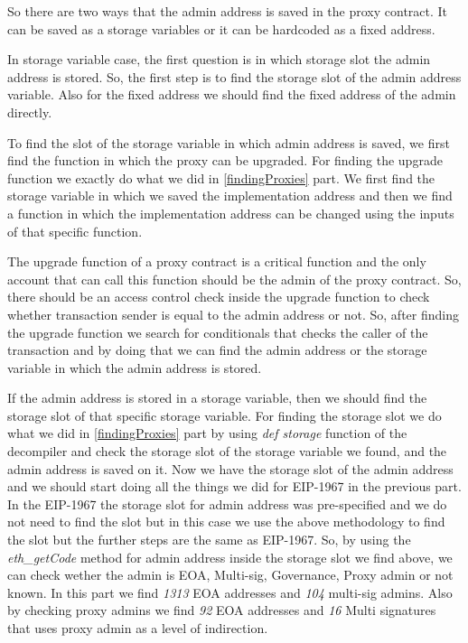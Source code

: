 So there are two ways that the admin address is saved in the proxy contract. It can be saved as a storage variables or it can be hardcoded as a fixed address.

In storage variable case, the first question is in which storage slot the admin address is stored. So, the first step is to find the storage slot of the admin address variable. Also for the fixed address we should find the fixed address of the admin directly.

To find the slot of the storage variable in which admin address is saved, we first find the function in which the proxy can be upgraded. For finding the upgrade function we exactly do what we did in \ref{findingProxies} part. We first find the storage variable in which we saved the implementation address and then we find a function in which the implementation address can be changed using the inputs of that specific function. 

The upgrade function of a proxy contract is a critical function and the only account that can call this function should be the admin of the proxy contract. So, there should be an access control check inside the upgrade function to check whether transaction sender is equal to the admin address or not.
So, after finding the upgrade function we search for conditionals that checks the caller of the transaction and by doing that we can find the admin address or the storage variable in which the admin address is stored.


If the admin address is stored in a storage variable, then we should find the storage slot of that specific storage variable. For finding the storage slot we do what we did in \ref{findingProxies} part by using \textit{def storage} function of the decompiler and check the storage slot of the storage variable we found, and the admin address is saved on it. 
Now we have the storage slot of the admin address and we should start doing all the things we did for EIP-1967 in the previous part. 
In the EIP-1967 the storage slot for admin address was pre-specified and we do not need to find the slot but in this case we use the above methodology to find the slot but the further steps are the same as EIP-1967.
So, by using the \textit{eth\_getCode} method for admin address inside the storage slot we find above, we can check wether the admin is EOA, Multi-sig, Governance, Proxy admin or not known.
In this part we find \textit{1313} EOA addresses and \textit{104} multi-sig admins. Also by checking proxy admins we find \textit{92} EOA addresses and \textit{16} Multi signatures that uses proxy admin as a level of indirection. 

